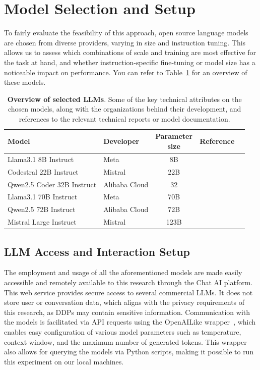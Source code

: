 \documentclass{DESSThesis}
\begin{document}
\section{Model Selection and Setup}

To fairly evaluate the feasibility of this approach, open source language models are chosen from diverse providers, varying in size and instruction tuning. This allows us to assess which combinations of scale and training are most effective for the task at hand, and whether instruction-specific fine-tuning or model size has a noticeable impact on performance. You can refer to Table~\ref{tab:llm_overview} for an overview of these models.

\begin{table}[ht]
\centering
\small
\begin{tabular}{l l c c l}
\toprule
\textbf{Model} & 
\textbf{Developer} &
\makecell{\textbf{Parameter} \\ \textbf{size}} &
\textbf{Reference} \\
\midrule
Llama3.1 8B Instruct       & Meta        & 8B   &~\cite{grattafiori2024llama3herdmodels} \\
Codestral 22B Instruct     & Mistral        & 22B   &~\cite{codestral} \\
Qwen2.5 Coder 32B Instruct & Alibaba Cloud   & 32   &~\cite{qwen2} \\
Llama3.1 70B Instruct      & Meta        & 70B  &~\cite{grattafiori2024llama3herdmodels} \\
Qwen2.5 72B Instruct       & Alibaba Cloud   & 72B  &~\cite{qwen2} \\
Mistral Large Instruct     & Mistral        & 123B  &~\cite{largemistral} \\
\bottomrule
\end{tabular}
\caption[Overview of selected LLMs]{\textbf{Overview of selected LLMs}. Some of the key technical attributes on the chosen models, along with the organizations behind their development, and references to the relevant technical reports or model documentation.}
\label{tab:llm_overview}
\end{table}

\subsection{LLM Access and Interaction Setup}

The employment and usage of all the aforementioned models are made easily accessible and remotely available to this research through the Chat AI platform. This web service provides secure access to several commercial LLMs. It does not store user or conversation data, which aligns with the privacy requirements of this research, as DDPs may contain sensitive information. Communication with the models is facilitated via API requests using the OpenAILike wrapper~\cite{openai_like}, which enables easy configuration of various model parameters such as temperature, context window, and the maximum number of generated tokens. This wrapper also allows for querying the models via Python scripts, making it possible to run this experiment on our local machines. 
\end{document}
